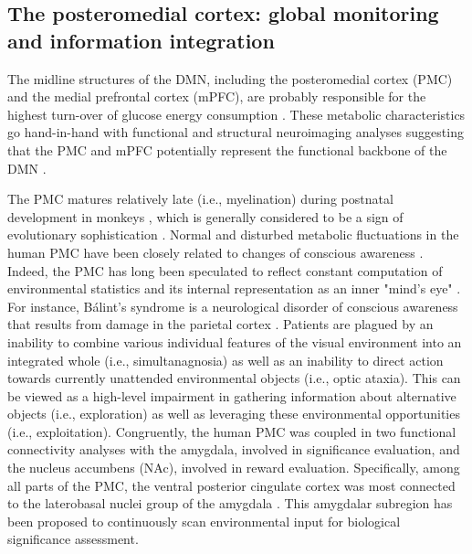 \documentclass[10pt,letterpaper]{article}
\begin{document}
\subsection{The posteromedial cortex: global monitoring and information integration}
The midline structures of the DMN,
including the posteromedial cortex (PMC) and
the medial prefrontal cortex (mPFC),
are probably responsible for the highest turn-over
of glucose energy consumption \citep{raichle2001pnas}.
These metabolic characteristics go hand-in-hand with
functional and structural neuroimaging analyses
suggesting that the PMC and mPFC
potentially represent the functional backbone of the DMN
\citep{andrews2010, hagmann2008mapping}.


The PMC matures relatively late (i.e., myelination) during postnatal development in monkeys
\citep{goldman1987development}, which is generally considered to
be a sign of evolutionary sophistication \citep{flechsig1920}.
Normal and disturbed metabolic fluctuations in the
human PMC have been closely related to
changes of conscious awareness \citep{cavanna2006precuneus}.
%
Indeed,
the PMC has long been speculated to reflect constant computation of
environmental statistics and its internal representation
as an inner "mind's eye" \citep{cavanna2006precuneus, leech_pcc2014}.
For instance, B\'alint's syndrome is a neurological disorder of conscious
awareness that results from damage in the parietal cortex
\citep{balint1909seelenlahmung}.
Patients are plagued by an
inability to combine various individual features of the visual
environment into an integrated whole (i.e., simultanagnosia)
as well as an inability to direct action towards
currently unattended environmental objects
(i.e., optic ataxia).
This can be viewed as a high-level impairment in gathering
information about alternative objects (i.e., exploration) as well as
leveraging these environmental opportunities (i.e., exploitation).
Congruently,
the human PMC was coupled in two functional connectivity analyses
with the amygdala, involved in significance evaluation, and
the nucleus accumbens (NAc), involved in reward evaluation.
Specifically, among all parts of the PMC,
the ventral posterior cingulate cortex was
most connected to the laterobasal
nuclei group of the amygdala
\citep{bzdok2015subspecialization}.
This amygdalar subregion has been proposed to
continuously scan environmental input
for biological significance assessment.
\end{document}
